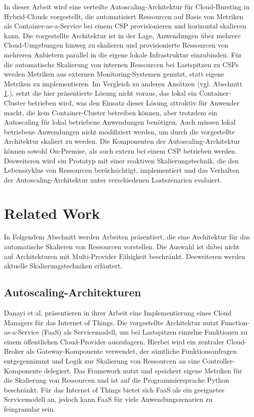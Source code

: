 \documentclass[runningheads]{llncs}
\begin{document}
In dieser Arbeit wird eine verteilte Autoscaling-Architektur für Cloud-Bursting in Hybrid-Clouds vorgestellt, die automatisiert Ressourcen auf Basis von Metriken als Container-as-a-Service bei einem CSP provisionieren und horizontal skalieren kann. Die vorgestellte Architektur ist in der Lage, Anwendungen über mehrere Cloud-Umgebungen hinweg zu skalieren und provisionierte Ressourcen von meh\-reren Anbietern parallel in die eigene lokale Infrastruktur einzubinden. Für die automatische Skalierung von internen Ressourcen bei Lastspitzen zu CSPs werden Metriken aus externen Monitoring-Systemen genutzt, statt eigene Metriken zu implementieren. Im Vergleich zu anderen Ansätzen (vgl. Abschnitt \ref{work}.), setzt die hier präsentierte Lösung nicht voraus, das lokal ein Container-Cluster betrieben wird, was den Einsatz dieser Lösung attraktiv für Anwender macht, die kein Container-Cluster betreiben können, aber trotzdem ein Autoscaling für lokal betriebene Anwendungen benötigen. Auch müssen lokal betriebene Anwendungen nicht modifiziert werden, um durch die vorgestellte Architektur skaliert zu werden. Die Komponenten der Autoscaling-Architektur können sowohl On-Premise, als auch extern bei einem CSP betrieben werden. \\

Desweiteren wird ein Prototyp mit einer reaktiven Skalierungstechnik, die den Lebenszyklus von Ressourcen berücksichtigt, implementiert und das Verhalten der Autoscaling-Architektur unter verschiedenen Lastszenarien evaluiert.

	
\section{Related Work} \label{work}

In Folgendem Abschnitt werden Arbeiten präsentiert, die eine Architektur für das automatische Skalieren von Ressourcen vorstellen. Die Auswahl ist dabei nicht auf Architekturen mit Multi-Provider Fähigkeit beschränkt. Desweiteren werden aktuelle Skalierungstechniken erläutert. 
	
\subsection{Autoscaling-Architekturen}

Danayi et al. \cite{danayi_opencot_2019} präsentieren in ihrer Arbeit eine Implementierung eines Cloud Managers für das Internet of Things. Die vorgestellte Architektur nutzt Function-as-a-Service (FaaS) als Servicemodell, um bei Lastspitzen einzelne Funktionen zu einem öffentlichen Cloud-Provider auszulagern. Hierbei wird ein zentraler Cloud-Broker als Gateway-Komponente verwendet, der sämtliche Funktionsanfragen entgegennimmt und Logik zur Skalierung von Ressourcen an eine Controller-Komponente delegiert. Das Framework nutzt und speichert eigene Metriken für die Skalierung von Ressourcen und ist auf die Programmiersprache Python beschränkt. Für das Internet of Things bietet sich FaaS als ein geeignetes Servicemodell an, jedoch kann FaaS für viele Anwendungszenarien zu feingranular sein. \\
	
\end{document}
